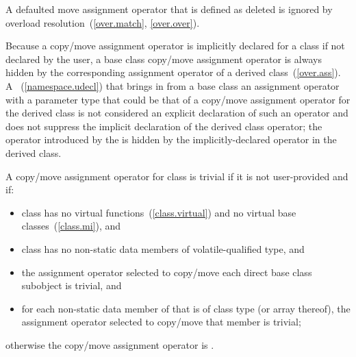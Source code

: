 A defaulted move assignment operator that is defined as deleted is ignored by
overload resolution~(\ref{over.match}, \ref{over.over}).

\pnum
{}%
%
Because a copy/move assignment operator is implicitly declared for a class
if not declared by the user,
a base class copy/move assignment operator is always hidden
by the corresponding assignment operator of a derived class~(\ref{over.ass}).
A
~(\ref{namespace.udecl}) that brings in from a base class an assignment operator
with a parameter type that could be that of a
copy/move assignment operator for the
derived class is not considered an explicit declaration of such an
operator and does not suppress the implicit declaration of the derived class
operator;
the operator introduced by the
is hidden by the implicitly-declared operator in the derived
class.

\pnum
{}%
%
A copy/move assignment operator for class
is
trivial
if it is not user-provided and if:

\begin{itemize}
\item
class
has no virtual functions~(\ref{class.virtual})
and no virtual base classes~(\ref{class.mi}), and

\item class  has no non-static data members of volatile-qualified
type, and

\item the assignment operator selected to copy/move each direct
base class subobject is trivial, and

\item
for each non-static data member of
that is of class type (or array thereof),
the assignment operator selected to copy/move that member is trivial;
\end{itemize}

otherwise the copy/move assignment operator is
.

